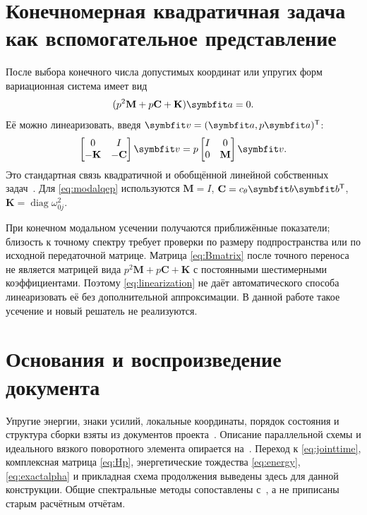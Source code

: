 \documentclass[11pt,a4paper]{article}
\numberwithin{equation}{section}
\newcommand{\cth}{c_\theta}
\DeclareMathOperator{\diag}{diag}
\begin{document}
\appendix
\section{Конечномерная квадратичная задача как вспомогательное представление}
\label{app:qep}

После выбора конечного числа допустимых координат или упругих форм
вариационная система имеет вид
\[
 (p^2\mathbf M+p\mathbf C+\mathbf K)\symbfit a=0.
\]
Её можно линеаризовать, введя $\symbfit v=(\symbfit a,p\symbfit a)^{\mathsf T}$:
\begin{equation}
 \begin{bmatrix}0&I\\-\mathbf K&-\mathbf C\end{bmatrix}\symbfit v
 =p\begin{bmatrix}I&0\\0&\mathbf M\end{bmatrix}\symbfit v.
 \label{eq:linearization}
\end{equation}
Это стандартная связь квадратичной и обобщённой линейной собственных
задач~\cite{tisseur2001}. Для \eqref{eq:modalqep} используются
$\mathbf M=I$, $\mathbf C=\cth\symbfit b\symbfit b^{\mathsf T}$,
$\mathbf K=\diag\omega_{0j}^2$.

При конечном модальном усечении получаются приближённые показатели;
близость к точному спектру требует проверки по размеру подпространства
или по исходной передаточной матрице. Матрица \eqref{eq:Bmatrix} после
точного переноса не является матрицей вида
$p^2\mathbf M+p\mathbf C+\mathbf K$ с постоянными шестимерными коэффициентами.
Поэтому \eqref{eq:linearization} не даёт автоматического способа
линеаризовать её без дополнительной аппроксимации. В данной работе
такое усечение и новый решатель не реализуются.

\section{Основания и воспроизведение документа}

Упругие энергии, знаки усилий, локальные координаты, порядок состояния
и структура сборки взяты из документов проекта~\cite{projectjoint,projectsource}.
Описание параллельной схемы и идеального вязкого поворотного элемента
опирается на~\cite{comsolkv,mathworksdamper}. Переход к \eqref{eq:jointtime},
комплексная матрица \eqref{eq:Hp}, энергетические тождества
\eqref{eq:energy}, \eqref{eq:exactalpha} и прикладная схема продолжения
выведены здесь для данной конструкции. Общие спектральные методы
сопоставлены с~\cite{tisseur2001,guettel2017}, а не приписаны старым
расчётным отчётам.
\end{document}
